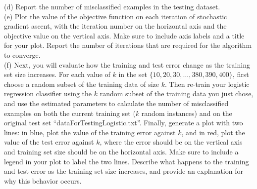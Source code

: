 \documentclass[a4paper]{article}
\theoremstyle{definition}
\begin{document}
(d) Report the number of misclassified examples in the testing dataset.\\

(e) Plot the value of the objective function on each iteration of stochastic gradient ascent, with the iteration number on the horizontal axis and the objective value on the vertical axis. Make sure to include axis labels and a title for your plot. Report the number of iterations that are required for the algorithm to converge. \\

(f) Next, you will evaluate how the training and test error change as the training set size increases. For each value of $k$ in the set $\{10, 20, 30, \ldots, 380, 390, 400\}$, first choose a random subset of the training data of size $k$.  Then re-train your logistic regression classifier using the $k$ random subset of the training data you just chose, and use the estimated parameters to calculate the number of misclassified examples on both the current training set ($k$ random instances) and on the original test set ``dataForTestingLogistic.txt''. Finally, generate a plot with two lines: in blue, plot the value of the training error against $k$, and in red, plot the value of the test error against $k$, where the error should be on the vertical axis and training set size should be on the horizontal axis. Make sure to include a legend in your plot to label the two lines. Describe what happens to the training and test error as the training set size increases, and provide an explanation for why this behavior occurs.
    







\end{document}
